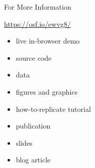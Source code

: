 \appendix

\begin{frame}{For More Information}

\vspace{1ex}

{\HUGE\url{https://osf.io/ewvg8/}}

\vspace{3ex}

\begin{itemize}
\item live in-browser demo
\item source code
\item data
\item figures and graphics
\item how-to-replicate tutorial
\item publication
\item slides
\item blog article
\end{itemize}

\end{frame}

